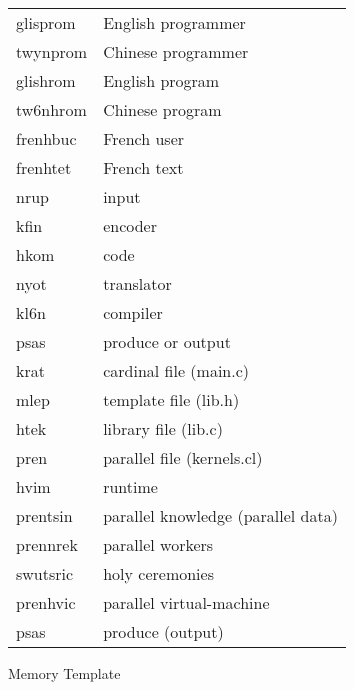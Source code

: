 \begin{figure}
\caption{Memory Template}
\label{memoryTemplate}
\begin{tabular}{ll}
  glisprom & English programmer \\
  twynprom & Chinese programmer \\
  glishrom & English program \\
  tw6nhrom & Chinese program \\
  frenhbuc & French user \\
  frenhtet & French text \\
  nrup & input \\
  kfin & encoder \\
  hkom & code \\
  nyot & translator \\
  kl6n & compiler \\
  psas & produce or output \\
  krat & cardinal file (main.c) \\
  mlep & template file (lib.h) \\
  htek & library file (lib.c) \\
  pren & parallel file (kernels.cl) \\
  hvim & runtime \\
  prentsin & parallel knowledge (parallel data) \\
  prennrek & parallel workers \\
  swutsric & holy ceremonies \\
  prenhvic & parallel virtual-machine \\
  psas & produce  (output) \\
\end{tabular}
\end{figure}

